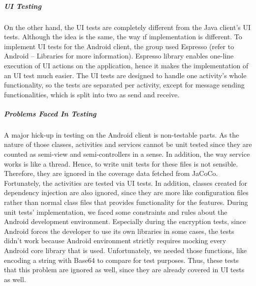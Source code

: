 \documentclass[11pt,a4paper]{report}
\begin{document}
\subparagraph{UI Testing}
On the other hand, the UI tests are completely different from the Java client’s UI tests. Although the idea is the same, the way ıf implementation is different. To implement UI tests for the Android client, the group used Espresso (refer to Android – Libraries for more information). Espresso library enables one-line execution of UI actions on the application, hence it makes the implementation of an UI test much easier. The UI tests are designed to handle one activity’s whole functionality, so the tests are separated per activity, except for message sending functionalities, which is split into two as send and receive.

\subparagraph{Problems Faced In Testing}
A major hick-up in testing on the Android client is non-testable parts. As the nature of those classes, activities and services cannot be unit tested since they are counted as semi-view and semi-controllers in a sense. In addition, the way service works is like a thread. Hence, to write unit tests for these files is not sensible. Therefore, they are ignored in the coverage data fetched from JaCoCo. Fortunately, the activities are tested via UI tests. In addition, classes created for dependency injection are also ignored, since they are more like configuration files rather than normal class files that provides functionality for the features.
During unit tests’ implementation, we faced some constraints and rules about the Android development environment. Especially during the encryption tests, since Android forces the developer to use its own libraries in some cases, the tests didn’t work because Android environment strictly requires mocking every Android core library that is used. Unfortunately, we needed those functions, like encoding a string with Base64 to compare for test purposes. Thus, these tests that this problem are ignored as well, since they are already covered in UI tests as well.
\end{document}
